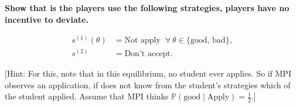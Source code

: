 \documentclass[10pt]{article}
\begin{document}
\textbf{Show that is the players use the following strategies, players have no incentive to
deviate.}

\begin{align*}
    s^{(1)}(\theta) & = \text{Not apply } \ \forall \ \theta \in \{\text{good, bad}\}, \\
    s^{(2)} & = \text{Don't accept}.
\end{align*}

[Hint: For this, note that in this equilibrium, no student ever applies. So if MPI
observes an application, if does not know from the student's strategies which
of the student applied. Assume that MPI thinks
\(\mathbb{P}(\text{good} \mid \text{Apply}) = \frac{1}{2}\).]
\end{document}

